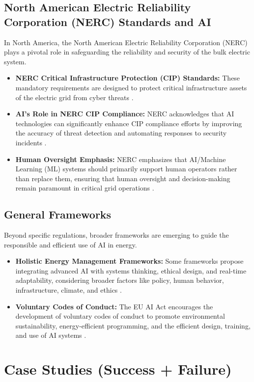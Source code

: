 \subsection{North American Electric Reliability Corporation (NERC) Standards and AI}
In North America, the North American Electric Reliability Corporation (NERC) plays a pivotal role in safeguarding the reliability and security of the bulk electric system.
\begin{itemize}
    \item \textbf{NERC Critical Infrastructure Protection (CIP) Standards:} These mandatory requirements are designed to protect critical infrastructure assets of the electric grid from cyber threats \cite{GlobalOwls_NERC_CIP, Microsoft_NERC_CIP}.
    \item \textbf{AI's Role in NERC CIP Compliance:} NERC acknowledges that AI technologies can significantly enhance CIP compliance efforts by improving the accuracy of threat detection and automating responses to security incidents \cite{AmpyxCyber_NERC_AI}.
    \item \textbf{Human Oversight Emphasis:} NERC emphasizes that AI/Machine Learning (ML) systems should primarily support human operators rather than replace them, ensuring that human oversight and decision-making remain paramount in critical grid operations \cite{NERC_AI_Whitepaper}.
\end{itemize}

\subsection{General Frameworks}
Beyond specific regulations, broader frameworks are emerging to guide the responsible and efficient use of AI in energy.
\begin{itemize}
    \item \textbf{Holistic Energy Management Frameworks:} Some frameworks propose integrating advanced AI with systems thinking, ethical design, and real-time adaptability, considering broader factors like policy, human behavior, infrastructure, climate, and ethics \cite{Medium_Holistic_AI}.
    \item \textbf{Voluntary Codes of Conduct:} The EU AI Act encourages the development of voluntary codes of conduct to promote environmental sustainability, energy-efficient programming, and the efficient design, training, and use of AI systems \cite{WhiteCase_EU_AI_Act}.
\end{itemize}

\section{Case Studies (Success + Failure)}

